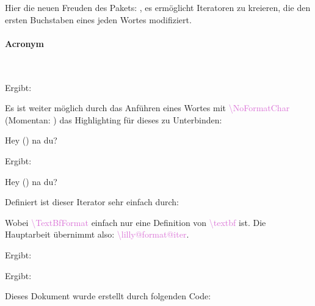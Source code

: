 \documentclass{article}
\newcommand*\blankcmd[1]{\textcolor{Orchid}{\LILLYxlstTypeWriter\textbackslash #1}}
\begin{document}
\begin{bemerkung}
    Hier die neuen Freuden des Pakets: , es ermöglicht
    Iteratoren zu kreieren, die den ersten Buchstaben eines jeden Wortes modifiziert.
\end{bemerkung}

\paragraph{Acronym}~\\[-\baselineskip]
\begin{latex}
\end{latex}
Ergibt:
\begin{center}
\end{center}
Es ist weiter möglich durch das Anführen eines Wortes mit \blankcmd{NoFormatChar} (Momentan: \NoFormatChar) das Highlighting für dieses zu Unterbinden:
\begin{latex}
Hey () na du?
\end{latex}
Ergibt:
\begin{center}
    Hey () na du?
\end{center}
Definiert ist dieser Iterator sehr einfach durch:
Wobei \blankcmd{TextBfFormat} einfach nur eine Definition von \blankcmd{textbf} ist. Die Hauptarbeit übernimmt also:
\blankcmd{lilly@format@iter}.

\begin{latex}
\end{latex}
Ergibt:
\begin{center}
\end{center}

\begin{latex}
\end{latex}
Ergibt:
\begin{center}
\end{center}

\clearpage

Dieses Dokument wurde erstellt durch folgenden Code:
\end{document}
